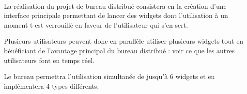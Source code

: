 \paragraph{}La réalisation du projet de bureau distribué consistera en la création d'une interface principale permettant de lancer des widgets dont l'utilisation à un moment t est verrouillé en faveur de l'utilisateur qui s'en sert. 

Plusieurs utilisateurs peuvent donc en parallèle utiliser plusieurs widgets tout en bénéficiant de l'avantage principal du bureau distribué : voir ce que les autres utilisateurs font en temps réel.

Le bureau permettra l'utilisation simultanée de jusqu'à 6 widgets et en implémentera 4 types différents.
